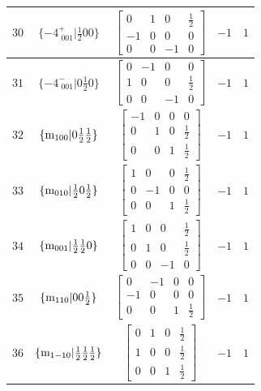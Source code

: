 \documentclass[fleqn,8pt]{jsarticle}
\begin{document}
\begin{longtable}{ccccc}
$ 30 $ & $ \{-4^{+}_{\,\,001}|\frac{1}{2} 0 0\} $ & $ \begin{bmatrix} 0 & 1 & 0 & \frac{1}{2} \\ -1 & 0 & 0 & 0 \\ 0 & 0 & -1 & 0 \end{bmatrix} $ & $ -1 $ & $ 1 $ \\ \hline
$ 31 $ & $ \{-4^{-}_{\,\,001}|0 \frac{1}{2} 0\} $ & $ \begin{bmatrix} 0 & -1 & 0 & 0 \\ 1 & 0 & 0 & \frac{1}{2} \\ 0 & 0 & -1 & 0 \end{bmatrix} $ & $ -1 $ & $ 1 $ \\ \hline
$ 32 $ & $ \{{\rm m}_{100}|0 \frac{1}{2} \frac{1}{2}\} $ & $ \begin{bmatrix} -1 & 0 & 0 & 0 \\ 0 & 1 & 0 & \frac{1}{2} \\ 0 & 0 & 1 & \frac{1}{2} \end{bmatrix} $ & $ -1 $ & $ 1 $ \\ \hline
$ 33 $ & $ \{{\rm m}_{010}|\frac{1}{2} 0 \frac{1}{2}\} $ & $ \begin{bmatrix} 1 & 0 & 0 & \frac{1}{2} \\ 0 & -1 & 0 & 0 \\ 0 & 0 & 1 & \frac{1}{2} \end{bmatrix} $ & $ -1 $ & $ 1 $ \\ \hline
$ 34 $ & $ \{{\rm m}_{001}|\frac{1}{2} \frac{1}{2} 0\} $ & $ \begin{bmatrix} 1 & 0 & 0 & \frac{1}{2} \\ 0 & 1 & 0 & \frac{1}{2} \\ 0 & 0 & -1 & 0 \end{bmatrix} $ & $ -1 $ & $ 1 $ \\ \hline
$ 35 $ & $ \{{\rm m}_{110}|0 0 \frac{1}{2}\} $ & $ \begin{bmatrix} 0 & -1 & 0 & 0 \\ -1 & 0 & 0 & 0 \\ 0 & 0 & 1 & \frac{1}{2} \end{bmatrix} $ & $ -1 $ & $ 1 $ \\ \hline
$ 36 $ & $ \{{\rm m}_{1-10}|\frac{1}{2} \frac{1}{2} \frac{1}{2}\} $ & $ \begin{bmatrix} 0 & 1 & 0 & \frac{1}{2} \\ 1 & 0 & 0 & \frac{1}{2} \\ 0 & 0 & 1 & \frac{1}{2} \end{bmatrix} $ & $ -1 $ & $ 1 $ \\ \hline

\end{longtable}
\end{document}
